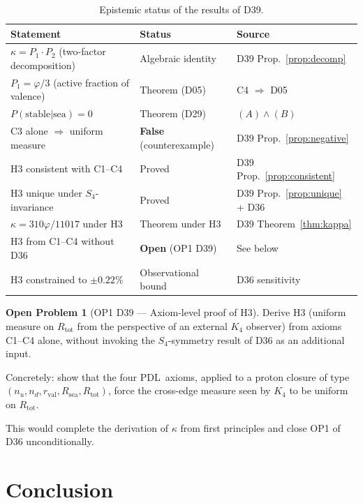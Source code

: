 \documentclass[11pt,a4paper]{article}
\theoremstyle{definition}
\newtheorem{openprob}{Open Problem}
\newcommand{\PDL}{\textnormal{PDL}}
\newcommand{\Kfour}{K_4}
\newcommand{\rval}{r_{\mathrm{val}}}
\newcommand{\Rsea}{R_{\mathrm{sea}}}
\newcommand{\Rtot}{R_{\mathrm{tot}}}
\newcommand{\vp}{\varphi}
\newcommand{\kap}{\kappa}
\begin{document}
\begin{table}[ht]
\centering
\caption{Epistemic status of the results of D39.}
\label{tab:epistemic}
\medskip
\begin{tabular}{>{\raggedright}p{6.8cm}p{3.0cm}p{3.2cm}}
\toprule
Statement & Status & Source \\
\midrule
$\kap = P_1\cdot P_2$ (two-factor decomposition) &
  Algebraic identity & D39 Prop.~\ref{prop:decomp} \\[3pt]
$P_1 = \vp/3$ (active fraction of valence) &
  Theorem (D05) & C4 $\Rightarrow$ D05 \\[3pt]
$P(\mathrm{stable}|\mathrm{sea}) = 0$ &
  Theorem (D29) & $(A)\wedge(B)$ \\[3pt]
C3 alone $\Rightarrow$ uniform measure &
  \textbf{False} (counterexample) & D39 Prop.~\ref{prop:negative} \\[3pt]
H3 consistent with C1--C4 &
  Proved & D39 Prop.~\ref{prop:consistent} \\[3pt]
H3 unique under $S_4$-invariance &
  Proved & D39 Prop.~\ref{prop:unique} + D36 \\[3pt]
$\kap = 310\vp/11017$ under H3 &
  Theorem under H3 & D39 Theorem~\ref{thm:kappa} \\[3pt]
H3 from C1--C4 without D36 &
  \textbf{Open} (OP1 D39) & See below \\[3pt]
H3 constrained to $\pm 0.22\%$ &
  Observational bound & D36 sensitivity \\
\bottomrule
\end{tabular}
\end{table}

\begin{openprob}[OP1 D39 --- Axiom-level proof of H3]
\label{op:H3}
Derive H3 (uniform measure on $\Rtot$ from the perspective of an
external $\Kfour$ observer) from axioms C1--C4 alone, without
invoking the $S_4$-symmetry result of D36 as an additional input.

Concretely: show that the four \PDL\ axioms, applied to a proton
closure of type $(n_u, n_d, \rval, \Rsea, \Rtot)$, force the
cross-edge measure seen by $\Kfour$ to be uniform on $\Rtot$.

This would complete the derivation of $\kap$ from first principles
and close OP1 of D36 unconditionally.
\end{openprob}

\section*{Conclusion}
\end{document}
